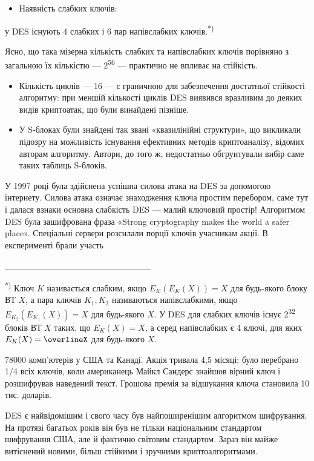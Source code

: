 \liststyleWWviiiNumxlix
\begin{itemize}
\item Наявність слабких ключів:
\end{itemize}
 у DES існують 4 слабких і 6 пар напівслабких ключів.\textsuperscript{*)}

Ясно, що така мізерна кількість слабких та напівслабких ключів порівняно з
загальною їх кількістю --- 2\textsuperscript{56} --- практично не впливає на
стійкість. 

\liststyleWWviiiNumxlix
\begin{itemize}
\item Кількість циклів --- 16 --- є граничною для забезпечення достатньої стійкості
алгоритму: при меншій кількості циклів DES виявився вразливим до деяких видів
криптоатак, що були винайдені пізніше.  
\item У S-блоках були знайдені так звані «квазилінійні структури», що викликали
підозру на можливість існування ефективних методів криптоаналізу, відомих
авторам алгоритму. Автори, до того ж, недостатньо обгрунтували вибір саме таких
таблиць S-блоків.
\end{itemize}

\bigskip

У 1997 році була здійснена успішна силова атака на DES за допомогою інтернету.
Силова атака означає знаходження ключа простим перебором, саме тут і далася
взнаки основна слабкість DES --- малий ключовий простір! Алгоритмом DES\textit{
}була зашифрована фраза «Strong cryptography makes the world a safer place».
Спеціальні сервери розсилали порції ключів учасникам акції. В експерименті
брали участь 

\_\_\_\_\_\_\_\_\_\_\_\_\_\_\_\_\_\_\_\_\_\_\_

\textsuperscript{*) }Ключ  $K$ називається слабким, якщо 
$E_{K}(E_K(X))=X$ для будь-якого блоку ВТ  $X$, а пара ключів 
$K_{1},K_2$ називаються напівслабкими, якщо 
$E_{K}_{{2}}(E_{K}_{1}(X))=X$ для будь-якого  $X$. У DES для слабких
ключів існує 2\textsuperscript{32}  блоків ВТ  $X$ таких, що 
$E_K(X)=X$, а серед напівслабких є 4 ключі, для яких 
$E_{K}(X)=\overlineX$ для будь-якого  $X$. 

78000 комп’ютерів у США та Канаді. Акція тривала 4,5 місяці; було перебрано 1/4
всіх ключів, коли американець Майкл Сандерс знайшов вірний ключ і розшифрував
наведений текст. Грошова премія за відшукання ключа становила 10 тис. доларів.

DES є найвідомішим і свого часу був найпоширенішим алгоритмом шифрування. На
протязі багатьох років він був не тільки національним стандартом шифрування
США, але й фактично світовим стандартом. Зараз він майже витіснений новими,
більш стійкими і зручними криптоалгоритмами.


